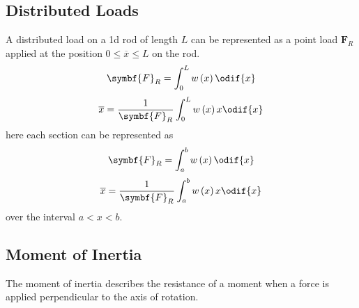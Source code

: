 \documentclass{article}
\begin{document}
\subsection{Distributed Loads}
A distributed load on a 1d rod of length \(L\) can be represented as a point load \(\symbf{F}_R\) applied at the position \(0 \leq \overline{x} \leq L\) on the rod.
\begin{equation*}
    \symbf{F}_R = \int_0^L w\left( x \right) \odif{x}
\end{equation*}
\begin{equation*}
    \overline{x} = \frac{1}{\symbf{F}_R} \int_0^L w\left( x \right) x \odif{x}
\end{equation*}
here each section can be represented as
\begin{equation*}
    \symbf{F}_R = \int_a^b w\left( x \right) \odif{x}
\end{equation*}
\begin{equation*}
    \overline{x} = \frac{1}{\symbf{F}_R} \int_a^b w\left( x \right) x \odif{x}
\end{equation*}
over the interval \(a < x < b\).
\subsection{Moment of Inertia}
The moment of inertia describes the resistance of a moment when a force is applied perpendicular to the axis
of rotation.
\end{document}
